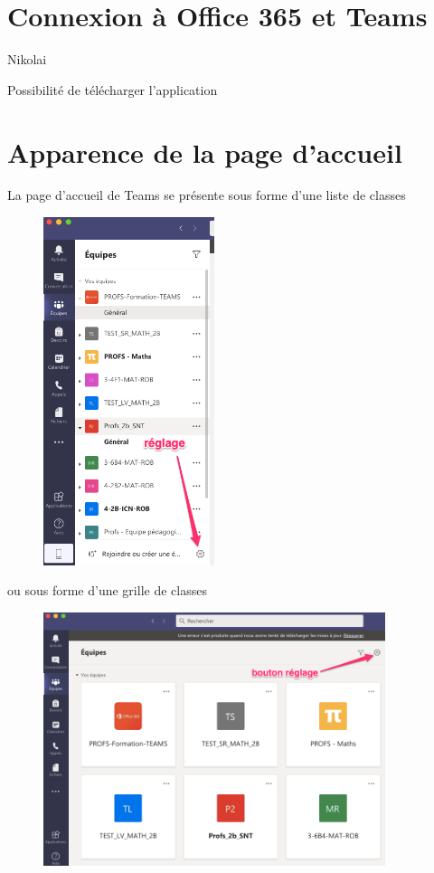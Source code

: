 \documentclass{article}
\begin{document}
\section{Connexion à Office 365 et Teams}

Nikolai

Possibilité de télécharger l'application

\section{Apparence de la page d'accueil}

La page d'accueil de Teams se présente sous forme d'une liste de classes 

\begin{figure}[h]
\includegraphics[width=5cm]{accueil_liste.png}
\centering
\end{figure}

ou sous forme d'une grille de classes \newpage

\begin{figure}[h]
\includegraphics[width=10cm]{accueil_grille.png}
\centering
\end{figure}
\end{document}

